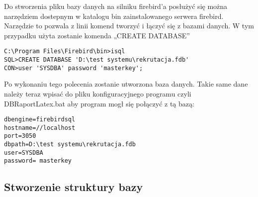 Do stworzenia pliku bazy danych na silniku firebird’a posłużyć się można narzędziem dostepnym w katalogu bin zainstalowanego serwera firebird.  Narzędzie to pozwala z linii komend tworzyć i łączyć się z bazami danych. W tym przypadku użyta zostanie komenda „CREATE DATABASE”
\begin{lstlisting}
C:\Program Files\Firebird\bin>isql
SQL>CREATE DATABASE 'D:\test systemu\rekrutacja.fdb'
CON>user 'SYSDBA' password 'masterkey';
\end{lstlisting}
Po wykonaniu tego polecenia zostanie utworzona baza danych. Takie same dane należy teraz wpisać do pliku konfiguracyjnego programu czyli DBRaportLatex.bat aby program mogł się połączyć z tą bazą:
\begin{lstlisting}
dbengine=firebirdsql
hostname=//localhost
port=3050
dbpath=D:\test systemu\rekrutacja.fdb
user=SYSDBA
password= masterkey
\end{lstlisting}
\subsection{ Stworzenie struktury bazy}

